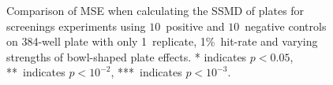 \begin{figure}[!htb]
  
  \caption{Comparison of MSE when calculating the SSMD of plates for
    screenings experiments using $10$~positive and $10$~negative
    controls on 384-well plate with only 1~replicate, 1\%~hit-rate and
    varying strengths of bowl-shaped plate effects. * indicates
    ${p<0.05}$, **~indicates ${p<10^{-2}}$, ***~indicates
    ${p<10^{-3}}$.}
  \label{fig:screening-ssmd-collection-10-10-stdev-3} 
\end{figure}





